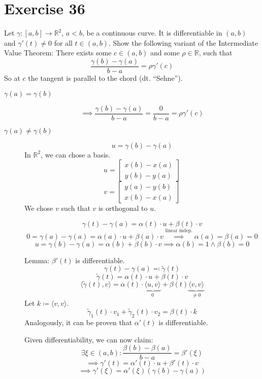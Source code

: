 \documentclass[a4paper]{article}
\theoremstyle{definition}
\begin{document}
\section{Exercise 36}
\begin{ex}
  Let $\gamma: [a,b] \to \mathbb R^2$, $a < b$, be a continuous curve. It is differentiable in $(a,b)$ and $\gamma'(t) \neq 0$ for all $t \in (a,b)$. Show the following variant of the Intermediate Value Theorem: There exists some $c \in (a,b)$ and some $\rho \in \mathbb R$, such that
  \[ \frac{\gamma(b) - \gamma(a)}{b - a} = \rho \gamma'(c) \]
  So at $c$ the tangent is parallel to the chord (dt. \enquote{Sehne}).
\end{ex}

\begin{description}
\item[$\gamma(a) = \gamma(b)$]
  \[ \implies \frac{\gamma(b) - \gamma(a)}{b - a} = \frac{0}{b - a} = \rho \gamma'(c) \]
\item[$\gamma(a) \neq \gamma(b)$]
  \[ u = \gamma(b) - \gamma(a) \]
  In $\mathbb R^2$, we can chose a basis.
  \[ u = \begin{bmatrix} x(b) - x(a) \\ y(b) - y(a) \end{bmatrix} \]
  \[ v = \begin{bmatrix} y(a) - y(b) \\ x(b) - x(a) \end{bmatrix} \]
  We chose $v$ such that $v$ is orthogonal to $u$.

  \[ \gamma(t) - \gamma(a) = \alpha(t) \cdot u + \beta(t) \cdot v \]
  \[ 0 = \gamma(a) - \gamma(a) = \alpha(a) \cdot u + \beta(a) \cdot v \overset{\text{linear indep.}}{\implies} \alpha(a) = \beta(a) = 0 \]
  \[ u = \gamma(b) - \gamma(a) = \alpha(b) + \beta(b) \cdot v \implies \alpha(b) = 1 \land \beta(b) = 0 \]

  Lemma: $\beta'(t)$ is differentiable.
  \[ \gamma(t) - \gamma(a) \eqqcolon \tilde{\gamma}(t) \]
  \[ \tilde{\gamma}(t) = \alpha(t) \cdot u + \beta(t) \cdot v \]
  \[ \langle \tilde{\gamma}(t), v\rangle = \alpha(t) \cdot \underbrace{\langle u, v\rangle}_{0} + \beta(t) \underbrace{\langle v,v\rangle}_{\neq 0} \]
  Let $k \coloneqq \langle v,v\rangle$.
  \[ \tilde{\gamma}_1(t) \cdot v_1 + \tilde{\gamma}_2(t) \cdot v_2 = \beta(t) \cdot k \]
  Analogously, it can be proven that $\alpha'(t)$ is differentiable.

  Given differentiability, we can now claim:
  \[ \exists \xi \in (a,b): \frac{\beta(b) - \beta(a)}{b - a} = \beta'(\xi) \]
  \[ \implies \gamma'(t) = \alpha'(t) \cdot u + \beta'(t) \cdot v \]
  \[ \implies \gamma'(\xi) = \alpha'(\xi) (\gamma(b) - \gamma(a)) \]
\end{description}
\end{document}
